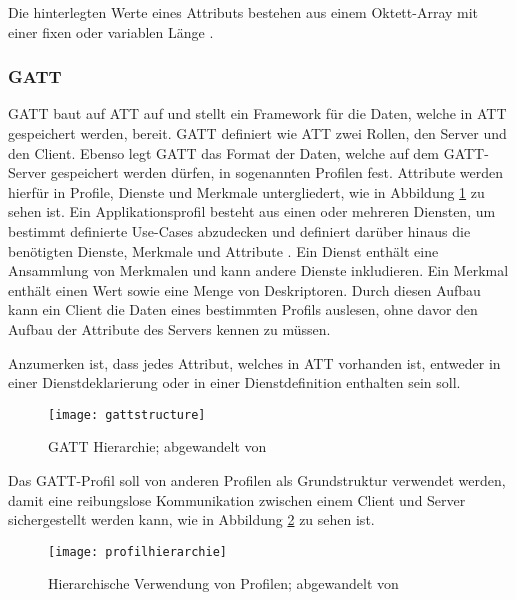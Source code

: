 Die hinterlegten Werte eines Attributs bestehen aus einem Oktett-Array mit einer fixen oder variablen Länge \cite[S.~1413]{bluetoothCore}.

\subsubsection{\acf{GATT}}
\ac{GATT} baut auf \ac{ATT} auf und stellt ein Framework für die Daten, welche in \ac{ATT} gespeichert werden, bereit. \ac{GATT} definiert wie \ac{ATT} zwei Rollen, den Server und den Client. Ebenso legt \ac{GATT} das Format der Daten, welche auf dem \ac{GATT}-Server gespeichert werden dürfen, in sogenannten Profilen fest. Attribute werden hierfür in Profile, Dienste und Merkmale untergliedert, wie in Abbildung \ref{fig:gattstructure} zu sehen ist. Ein Applikationsprofil besteht aus einen oder mehreren Diensten, um bestimmt definierte Use-Cases abzudecken und definiert darüber hinaus die benötigten Dienste, Merkmale und Attribute \cite[S.~207]{bluetoothCore}. Ein Dienst enthält eine Ansammlung von Merkmalen und kann andere Dienste inkludieren. Ein Merkmal enthält einen Wert sowie eine Menge von Deskriptoren. Durch diesen Aufbau kann ein Client die Daten eines bestimmten Profils auslesen, ohne davor den Aufbau der Attribute des Servers kennen zu müssen. \cite[S.~280, S.~1480]{bluetoothCore}

Anzumerken ist, dass jedes Attribut, welches in \ac{ATT} vorhanden ist, entweder in einer Dienstdeklarierung oder in einer Dienstdefinition enthalten sein soll. \cite[S.~1483]{bluetoothCore}

\begin{figure}[h]
    \centering
    \texttt{[image: gattstructure]}
    \caption{\acs{GATT} Hierarchie; abgewandelt von \cite[S.~281]{bluetoothCore}}
    \label{fig:gattstructure}
\end{figure}

Das \ac{GATT}-Profil soll von anderen Profilen als Grundstruktur verwendet werden, damit eine reibungslose Kommunikation zwischen einem Client und Server sichergestellt werden kann, wie in Abbildung \ref{fig:profilhierarchie} zu sehen ist. \cite[S.~1470]{bluetoothCore}

\begin{figure}[h]
    \centering
    \texttt{[image: profilhierarchie]}
    \caption{Hierarchische Verwendung von Profilen; abgewandelt von \cite[S.~1468]{bluetoothCore}}
    \label{fig:profilhierarchie}
\end{figure}

